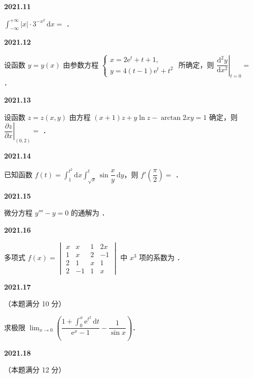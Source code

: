 \documentclass[UTF8,12pt,fontset=windows]{ctexart}
\begin{document}
\vfill
\newpage
{\large\bfseries 2021.11}

$\displaystyle\int_{-\infty}^{+\infty} |x| \cdot 3^{-x^2}\,\mathrm{d}x =$ \underline{\hspace{20mm}}．

\vfill
\newpage
{\large\bfseries 2021.12}

设函数 $y = y(x)$ 由参数方程 $\begin{cases} x = 2\mathrm{e}^t + t + 1, \\ y = 4(t-1)\mathrm{e}^t + t^2 \end{cases}$ 所确定，则 $\left.\dfrac{\mathrm{d}^2 y}{\mathrm{d}x^2}\right|_{t=0} =$ \underline{\hspace{20mm}}．

\vfill
\newpage
{\large\bfseries 2021.13}

设函数 $z = z(x,y)$ 由方程 $(x+1)z + y\ln z - \arctan 2xy = 1$ 确定，则 $\left.\dfrac{\partial z}{\partial x}\right|_{(0,2)} =$ \underline{\hspace{20mm}}．

\vfill
\newpage
{\large\bfseries 2021.14}

已知函数 $f(t) = \displaystyle\int_{1}^{t^2} \mathrm{d}x \int_{\sqrt{x}}^{t} \sin \dfrac{x}{y}\,\mathrm{d}y$，则 $f'\left(\dfrac{\pi}{2}\right) =$ \underline{\hspace{20mm}}．

\vfill
\newpage
{\large\bfseries 2021.15}

微分方程 $y''' - y = 0$ 的通解为 \underline{\hspace{20mm}}．

\vfill
\newpage
{\large\bfseries 2021.16}

多项式 $f(x) = \begin{vmatrix} x & x & 1 & 2x \\ 1 & x & 2 & -1 \\ 2 & 1 & x & 1 \\ 2 & -1 & 1 & x \end{vmatrix}$ 中 $x^3$ 项的系数为 \underline{\hspace{20mm}}．

\vfill
\newpage
{\large\bfseries 2021.17}

（本题满分 10 分）

求极限 $\displaystyle\lim_{x\to 0} \left(\dfrac{1 + \int_{0}^{x} \mathrm{e}^{t^2}\,\mathrm{d}t}{\mathrm{e}^x - 1} - \dfrac{1}{\sin x}\right)$．

\vfill
\newpage
{\large\bfseries 2021.18}

（本题满分 12 分）
\end{document}
